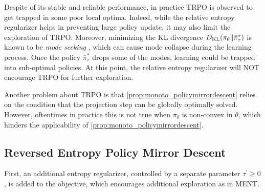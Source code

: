 Despite of its stable and reliable performance, in practice TRPO is observed to get trapped in some poor local optima. 
Indeed, while the relative entropy regularizer helps in preventing large policy update, it may also limit the exploration of TRPO.
Moreover, minimizing the KL divergence $D_{\mathrm{KL}}(\pi_\theta \| \bar{\pi}_\tau^*) $ is known to be \emph{mode seeking} \citep{kevin2012machine}, which can cause mode collapse during the learning process. Once the policy $\bar{\pi}_\tau^*$ drops some of the modes, learning could be trapped into sub-optimal policies.
At this point, the relative entropy regularizer will NOT encourage TRPO for further exploration.

Another problem about TRPO is that \cref{prop:monoto_policymirrordescent} relies on the condition that the projection step can be globally optimally solved.
However, oftentimes in practice this is not true when $\pi_\theta$ is non-convex in $\theta$, which hinders the applicability of \cref{prop:monoto_policymirrordescent}.

\subsection{Reversed Entropy Policy Mirror Descent }
\label{subsec:repmd}
First, an additional entropy regularizer, controlled by a separate parameter $\tau^{\prime}\geq 0$, is added to the objective, which encourages additional exploration as in MENT.

